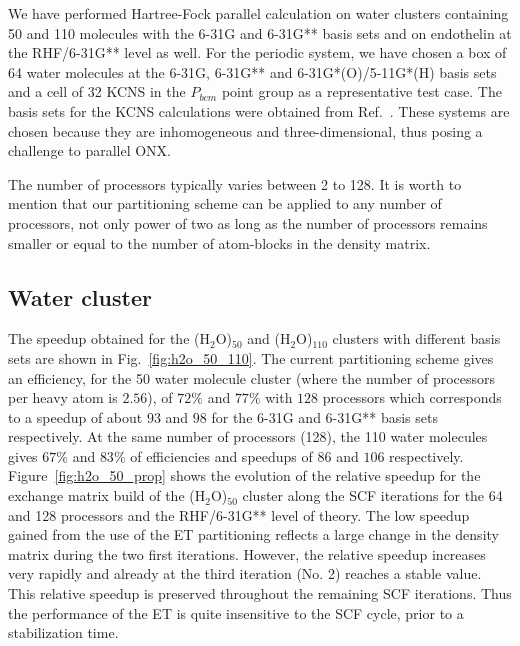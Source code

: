 \documentclass[twocolumn,showkeys,showpacs,preprintnumbers,amsmath,amssymb]{revtex4}
\begin{document}
 We have performed Hartree-Fock parallel calculation on 
 water clusters containing 50 and 110 molecules with 
 the 6-31G and 6-31G** basis sets and on endothelin at the RHF/6-31G** level as well.
 For the periodic system, we have chosen a box of 64 water molecules
 at the 6-31G, 6-31G** and 6-31G*(O)/5-11G*(H) basis sets
 and a cell of 32 KCNS in the $P_{bcm}$ point group as a representative 
 test case. The basis sets for the KCNS calculations were obtained from 
 Ref.~\cite{CrystalLib}.
 These systems are chosen because
 they are inhomogeneous and three-dimensional, thus posing a challenge
 to parallel ONX.

 The number of processors typically varies between 2 to 128. 
 It is worth to mention that our partitioning scheme can be 
 applied to any number of processors, not only power of two 
 as long as the number of processors remains smaller or equal 
 to the number of atom-blocks in the density matrix.

\subsection{Water cluster}

 The speedup obtained for the (H$_2$O)$_{50}$ 
 and (H$_2$O)$_{110}$ clusters 
 with different basis sets are shown in Fig.~\ref{fig:h2o_50_110}. 
 The current partitioning scheme
 gives an efficiency, for the 50 water molecule cluster 
 (where the number of processors per heavy atom is $2.56$), 
 of $72\%$ and $77\%$ with $128$ processors which 
 corresponds to a speedup of about $93$ and $98$ for 
 the 6-31G and 6-31G** basis sets respectively.  
 At the same number of processors (128), the 110 water molecules gives 
 $67\%$ and $83\%$ of efficiencies and speedups of $86$ and $106$ respectively.
 Figure~\ref{fig:h2o_50_prop} shows the evolution of the relative speedup for
 the exchange matrix build of
 the (H$_2$O)$_{50}$ cluster along the SCF iterations for 
 the 64 and 128 processors and the RHF/6-31G** level of theory. 
 The low speedup gained from the use of the ET partitioning  
 reflects a large change in the density matrix during the two first 
 iterations. However, the relative speedup increases very 
 rapidly and already at the third iteration (No. 2) reaches a stable value.
 This relative speedup is preserved throughout the remaining SCF iterations.
 Thus the performance of the ET is quite insensitive to the SCF cycle, prior to
 a stabilization time.
\end{document}
